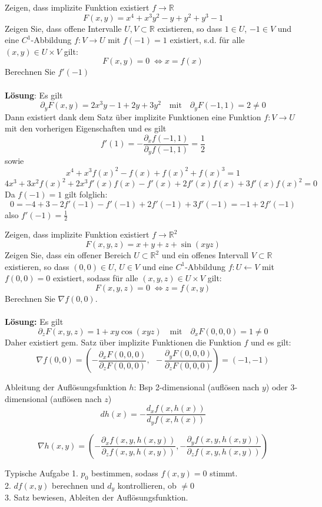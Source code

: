 \begin{Beispiel}{Zeigen, dass implizite Funktion existiert $f \rightarrow \mathbb{R}$}{}
\[ F(x, y) = x^4 + x^3y^2 - y + y^2 + y^3 - 1\]
Zeigen Sie, dass offene Intervalle $U, V \subset \mathbb{R}$ existieren, so dass $1 \in U$, $-1 \in V$
und eine $C^1$-Abbildung $f: V \rightarrow U$ mit $f(-1) = 1$ existiert, s.d. für alle $(x,y) \in U \times V$ gilt:
\[ F(x, y) = 0 \; \Longleftrightarrow x = f(x) \]
Berechnen Sie $f'(-1)$\\
\\
\textbf{Lösung}: Es gilt
\[ \partial_y F(x,y) = 2x^3y - 1 + 2y + 3y^2 ~~~ \text{ mit } ~~~ \partial_y F(-1, 1) = 2 \neq 0 \]
Dann existiert dank dem Satz über implizite Funktionen eine Funktion $f: V \rightarrow U$ mit den vorherigen
Eigenschaften und es gilt
\[ f'(1) = - \frac{\partial_x f(-1, 1)}{\partial_y f(-1, 1)} = \frac{1}{2} \]
sowie
\[ x^4 + x^3f(x)^2 - f(x) + f(x)^2 + f(x)^3 = 1 \]
\[ 4x^3 + 3x^2 f(x)^2 + 2x^3 f'(x) f(x) - f'(x) + 2f'(x)f(x) + 3f'(x)f(x)^2 = 0 \]
Da $f(-1) = 1$ gilt folglich:
\[ 0 = -4 + 3 - 2f'(-1) - f'(-1) + 2f'(-1) + 3f'(-1) = -1 + 2f'(-1)\]
also $f'(-1) = \frac{1}{2}$
\end{Beispiel}

\begin{Beispiel}{Zeigen, dass implizite Funktion existiert $f \rightarrow \mathbb{R}^2$}{}
\[ F(x,y,z) = x + y + z + \sin(xyz) \]
Zeigen Sie, dass ein offener Bereich $U \subset \mathbb{R}^2$ und ein offenes Intervall
$V \subset \mathbb{R}$ existieren, so dass $(0,0) \in U$, $U \in V$ und eine
$C^1$-Abbildung $f: U \leftarrow V$ mit $f(0,0) = 0$ existiert, sodass für alle $(x,y,z) \in U \times V$ gilt:
\[ F(x,y,z) = 0 \; \Longleftrightarrow z = f(x,y) \]
Berechnen Sie $\nabla f(0,0)$.\\
\\
\textbf{Lösung:} Es gilt
\[ \partial_z F(x,y,z) = 1 + xy \cos(xyz) ~~~ \text{ mit } ~~~ \partial_x F(0,0,0) = 1 \neq 0 \]
Daher existiert gem. Satz über implizite Funktionen die Funktion $f$ und es gilt:
\[ \nabla f(0,0) = \left( - \frac{\partial_x F(0,0,0)}{\partial_z F(0,0,0)}, ~~ -\frac{\partial_y F(0,0,0)}{\partial_z F(0,0,0)} \right) = (-1, -1) \]
\end{Beispiel} 


\begin{Rezept}{Ableitung der Auflösungsfunktion $h$:}{}
Bsp 2-dimensional (auflösen nach $y$) oder 3-dimensional (auflösen nach $z$)
\[
    dh(x) = -\frac{d_x f(x, h(x))}{d_y f(x, h(x))}
\]

\[
    \nabla h(x, y) =
        \left(
            -\frac{\partial_x f(x, y, h(x, y))}{\partial_z f(x, y, h(x, y))},
            -\frac{\partial_y f(x, y, h(x, y))}{\partial_z f(x, y, h(x, y))}
        \right)
\]
\end{Rezept}

\begin{Rezept}{Typische Aufgabe}{}
1. $p_0$ bestimmen, sodass $f(x, y)=0$ stimmt.\\
2. $df(x, y)$ berechnen und $d_y$ kontrollieren, ob $\neq 0$\\
3. Satz bewiesen, Ableiten der Auflösungsfunktion.
\end{Rezept}
